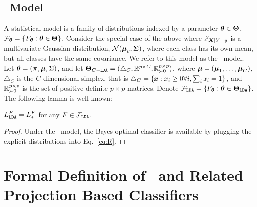 \documentclass[11pt]{extarticle}
\begin{document}
\subsection{\Lda~Model}

A statistical model is  a family of distributions indexed by a parameter $\boldsymbol{\theta} \in \boldsymbol{\Theta}$, $\mathcal{F}_{\boldsymbol{\theta}}=\{F_{\boldsymbol{\theta}} : \boldsymbol{\theta} \in \boldsymbol{\Theta} \}$.
Consider the special case of the above where $F_{\boldsymbol{X}|Y=y}$ is a multivariate Gaussian distribution,
$\mathcal{N}(\boldsymbol{\mu}_y,\boldsymbol{\Sigma})$, where each class has its own mean, but all classes have the same covariance.
We refer to this model as the \Lda~model.
Let $\boldsymbol{\theta}=(\boldsymbol{\pi},\boldsymbol{\mu},\boldsymbol{\Sigma})$, and let $\boldsymbol{\Theta}_{C-{\texttt{LDA}}}=( \triangle_C, \mathbb{R}^{p \times C},\mathbb{R}_{\succ 0}^{p \times p})$, where $\boldsymbol{\mu}=(\boldsymbol{\mu}_1,\ldots, \boldsymbol{\mu}_C)$, $\triangle_C$ is the $C$ dimensional simplex, that is $\triangle_C = \{ \boldsymbol{x} : x_i \geq 0 \forall i, \sum_i x_i = 1\}$, and $\mathbb{R}_{\succ 0}^{p \times p}$ is the set of positive definite  $p \times p$ matrices. Denote
$\mathcal{F}_{{\texttt{LDA}}}=\{F_{\boldsymbol{\theta}} : \boldsymbol{\theta} \in \boldsymbol{\Theta}_{{\texttt{LDA}}}\}$.
The following lemma is well known:
\begin{lem}
$L_{{\texttt{LDA}}}^F=L_*^F$ for any $F \in \mathcal{F}_{{\texttt{LDA}}}$.
\end{lem}

\begin{proof}
Under the \Lda~model, the Bayes optimal classifier is available by plugging the explicit distributions into Eq.~\eqref{eq:R}.
\end{proof}




\section{Formal Definition of \Lol~and Related Projection Based Classifiers}
\label{sec:LOL}
\end{document}
